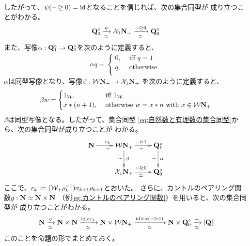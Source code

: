 	したがって、$\psi(-\unrhd0)=\id$となることを信じれば、次の集合同型が
	成り立つことがわかる。
	\begin{equation*}\begin{split}
		\bunsub[0] \xto[\simeq]{\psi} \mycal{X}_1\sizen_+\xto[\simeq]{-\unrhd0} \bunsub[0]
	\end{split}\end{equation*}
	また、写像$\alpha:\bunsub[1]\to\bunsub[0]$を次のように定義すると、
	\begin{equation*}\begin{split}
		\alpha q = \begin{cases}
			0, &\text{ iff } q = 1 \\
			q, &\text{ otherwise } \\
		\end{cases}
	\end{split}\end{equation*}
	$\alpha$は同型写像となり、写像$\beta:\Word\sizen_+\to\mycal{X}_1\sizen_+$
	を次のように定義すると、
	\begin{equation*}\begin{split}
		\beta w = \begin{cases}
			1_\Word, &\text{ iff } 1_\Word \\
			x * (n + 1), &\text{ otherwise } w = x * n
			\text{ with } x\in \Word\sizen_+ \\
		\end{cases}
	\end{split}\end{equation*}
	$\beta$は同型写像となる。したがって、集合同型
	\eqref{eq:自然数と有理数の集合同型}から、次の集合同型が成り立つことが
	わかる。
	\begin{equation*}\xymatrix{
		\sizen \ar[r]^{r_k}_\simeq
			& \Word\sizen_+ \ar[d]^{\beta}_\simeq \ar[r]^{-\rhd1}_\simeq
			&  \bunsub[1]\ar[d]^{\alpha}_\simeq \\
		& \mycal{X}_1\sizen_+ \ar[r]^{-\unrhd0}_\simeq & \bunsub[0] \\
	}\end{equation*}
	ここで、$r_k:=(\Word_+\rho_k^{-1})\sigma_{k+1}\rho_{k+1}$とおいた。
	さらに、カントルのペアリング関数$g:\sizen\simeq\sizen\times\sizen$
	（例\ref{eg:カントルのペアリング関数}）を用いると、次の集合同型が
	成り立つことがわかる。
	\begin{equation*}\begin{split}
		\sizen \xto[\simeq]{g} \sizen\times\sizen
		\xto[\simeq]{\id\times r_k} \sizen\times\Word\sizen_+
		\xto[\simeq]{\id\times\alpha(-\rhd1)} \sizen\times\bunsub[0]
		\xto[\simeq]{+} |\bun|
	\end{split}\end{equation*}
	このことを命題の形でまとめておく。

